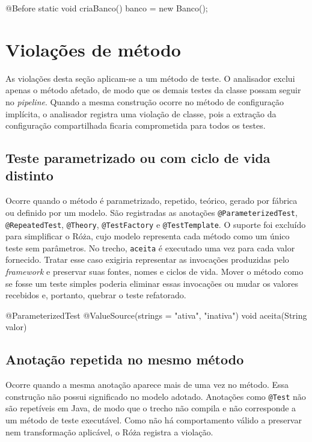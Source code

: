 \begin{violationexample}
@Before static void criaBanco() { banco = new Banco(); }
\end{violationexample}

\section{Violações de método}

As violações desta seção aplicam-se a um método de teste. O analisador exclui apenas o método afetado, de modo que os demais testes da classe possam seguir no \textit{pipeline}. Quando a mesma construção ocorre no método de configuração implícita, o analisador registra uma violação de classe, pois a extração da configuração compartilhada ficaria comprometida para todos os testes.

\subsection{Teste parametrizado ou com ciclo de vida distinto}

Ocorre quando o método é parametrizado, repetido, teórico, gerado por fábrica ou definido por um modelo. São registradas as anotações \texttt{@ParameterizedTest}, \texttt{@RepeatedTest}, \texttt{@Theory}, \texttt{@TestFactory} e \texttt{@TestTemplate}. O suporte foi excluído para simplificar o Róża, cujo modelo representa cada método como um único teste sem parâmetros. No trecho, \texttt{aceita} é executado uma vez para cada valor fornecido. Tratar esse caso exigiria representar as invocações produzidas pelo \textit{framework} e preservar suas fontes, nomes e ciclos de vida. Mover o método como se fosse um teste simples poderia eliminar essas invocações ou mudar os valores recebidos e, portanto, quebrar o teste refatorado.

\begin{violationexample}
@ParameterizedTest
@ValueSource(strings = {"ativa", "inativa"})
void aceita(String valor) {}
\end{violationexample}

\subsection{Anotação repetida no mesmo método}

Ocorre quando a mesma anotação aparece mais de uma vez no método. Essa construção não possui significado no modelo adotado. Anotações como \texttt{@Test} não são repetíveis em Java, de modo que o trecho não compila e não corresponde a um método de teste executável. Como não há comportamento válido a preservar nem transformação aplicável, o Róża registra a violação.

